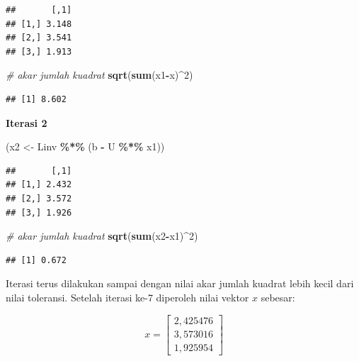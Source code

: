 \documentclass[
]{book}
\newenvironment{Shaded}{\begin{snugshade}}{\end{snugshade}}
\newcommand{\CommentTok}[1]{\textcolor[rgb]{0.56,0.35,0.01}{\textit{#1}}}
\newcommand{\DecValTok}[1]{\textcolor[rgb]{0.00,0.00,0.81}{#1}}
\newcommand{\FunctionTok}[1]{\textcolor[rgb]{0.13,0.29,0.53}{\textbf{#1}}}
\newcommand{\NormalTok}[1]{#1}
\newcommand{\OtherTok}[1]{\textcolor[rgb]{0.56,0.35,0.01}{#1}}
\newcommand{\SpecialCharTok}[1]{\textcolor[rgb]{0.81,0.36,0.00}{\textbf{#1}}}
\theoremstyle{definition}
\theoremstyle{definition}
\theoremstyle{definition}
\theoremstyle{definition}
\theoremstyle{remark}
\begin{document}
\begin{verbatim}
##       [,1]
## [1,] 3.148
## [2,] 3.541
## [3,] 1.913
\end{verbatim}

\begin{Shaded}
\begin{Highlighting}[]
\CommentTok{\# akar jumlah kuadrat}
\FunctionTok{sqrt}\NormalTok{(}\FunctionTok{sum}\NormalTok{(x1}\SpecialCharTok{{-}}\NormalTok{x)}\SpecialCharTok{\^{}}\DecValTok{2}\NormalTok{)}
\end{Highlighting}
\end{Shaded}

\begin{verbatim}
## [1] 8.602
\end{verbatim}

\textbf{Iterasi 2}

\begin{Shaded}
\begin{Highlighting}[]
\NormalTok{(x2 }\OtherTok{\textless{}{-}}\NormalTok{ Linv }\SpecialCharTok{\%*\%}\NormalTok{ (b }\SpecialCharTok{{-}}\NormalTok{ U }\SpecialCharTok{\%*\%}\NormalTok{ x1))}
\end{Highlighting}
\end{Shaded}

\begin{verbatim}
##       [,1]
## [1,] 2.432
## [2,] 3.572
## [3,] 1.926
\end{verbatim}

\begin{Shaded}
\begin{Highlighting}[]
\CommentTok{\# akar jumlah kuadrat}
\FunctionTok{sqrt}\NormalTok{(}\FunctionTok{sum}\NormalTok{(x2}\SpecialCharTok{{-}}\NormalTok{x1)}\SpecialCharTok{\^{}}\DecValTok{2}\NormalTok{)}
\end{Highlighting}
\end{Shaded}

\begin{verbatim}
## [1] 0.672
\end{verbatim}

Iterasi terus dilakukan sampai dengan nilai akar jumlah kuadrat lebih kecil dari nilai toleransi. Setelah iterasi ke-7 diperoleh nilai vektor \(x\) sebesar:

\[
x = \begin{bmatrix}
     2,425476     \\[0.3em]
     3,573016     \\[0.3em]
     1,925954
\end{bmatrix}
\]
\end{document}
